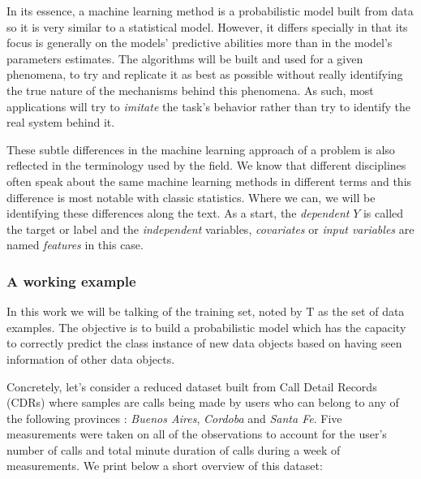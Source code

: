 In its essence, a machine learning method is a probabilistic model built from data so it is very similar to a statistical model. However, it differs specially in that its focus is generally on the models' predictive abilities more than in the model's parameters estimates.\textcite{breiman-statisticalmodeling} The algorithms will be built and used for a given phenomena, to try and replicate it as best as possible without really identifying the true nature of the mechanisms behind this phenomena. As such, most applications will try to \textit{imitate} the task's behavior rather than try to identify the real system behind it.


These subtle differences in the machine learning approach of a problem is also reflected in the terminology used by the field. We know that different disciplines often speak about the same machine learning methods in different terms and this difference is most notable with classic statistics. Where we can, we will be identifying these differences along the text. As a start, the \textit{dependent} $Y$ is called the target or label and the \textit{independent} variables, \textit{covariates} or \textit{input variables} are named \textit{features} in this case.


\subsubsection{A working example}\label{section-example}

In this work we will be talking of the training set, noted by $\mathrm{T}$ as the set of data examples. The objective is to build a probabilistic model which has the capacity to correctly predict the class instance of new data objects based on having seen information of other data objects.

Concretely, let's consider a reduced dataset built from Call Detail Records (CDRs) where samples are calls being made by users who can belong to any of the following provinces : \textit{Buenos Aires}, \textit{Cordoba} and \textit{Santa Fe}.
Five measurements were taken on all of the observations to account for the user's number of calls and total minute duration of calls during a week of measurements. We print below a short overview of this dataset:


